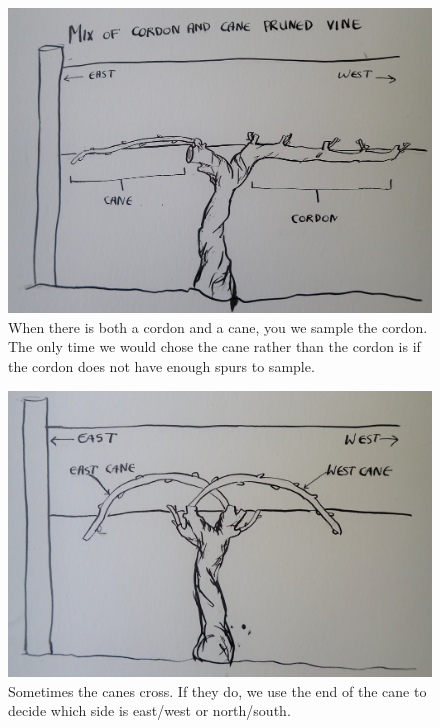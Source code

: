 \documentclass[11pt,letter]{article}
\begin{document}
\begin{figure}
  \includegraphics[width=\linewidth]{CaneCordonMix.jpg}
  \caption{When there is both a cordon and a cane, you we sample the cordon. The only time we would chose the cane rather than the cordon is if the cordon does not have enough spurs to sample.}
  \label{fig:CordonCane}
\end{figure}

\begin{figure}
  \includegraphics[width=\linewidth]{CaneCrossing.jpg}
  \caption{Sometimes the canes cross. If they do, we use the end of the cane to decide which side is east/west or north/south.}
  \label{fig:CaneCrossing}
\end{figure}
\end{document}

